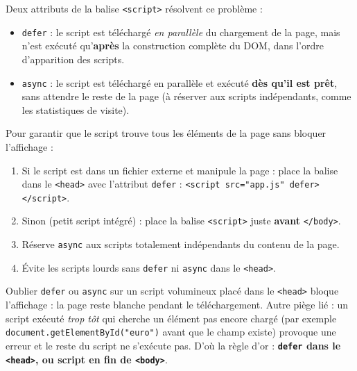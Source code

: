 \documentclass[11pt]{article}
\newcommand{\cle}[1]{{\popxbold\color{popdark}#1}}
\begin{document}
Deux attributs de la balise \texttt{<script>} résolvent ce problème :
\begin{itemize}
    \item \texttt{\cle{defer}} : le script est téléchargé \emph{en parallèle} du chargement de la page, mais n'est exécuté qu'\textbf{après} la construction complète du DOM, dans l'ordre d'apparition des scripts.
    \item \texttt{\cle{async}} : le script est téléchargé en parallèle et exécuté \textbf{dès qu'il est prêt}, sans attendre le reste de la page (à réserver aux scripts indépendants, comme les statistiques de visite).
\end{itemize}

\begin{methode}
Pour garantir que le script trouve tous les éléments de la page sans bloquer l'affichage :
\begin{enumerate}
    \item Si le script est dans un fichier externe et manipule la page : place la balise dans le \texttt{<head>} avec l'attribut \texttt{defer} : \texttt{<script src="app.js" defer></script>}.
    \item Sinon (petit script intégré) : place la balise \texttt{<script>} juste \textbf{avant} \texttt{</body>}.
    \item Réserve \texttt{async} aux scripts totalement indépendants du contenu de la page.
    \item Évite les scripts lourds sans \texttt{defer} ni \texttt{async} dans le \texttt{<head>}.
\end{enumerate}
\end{methode}

\begin{attention}
Oublier \texttt{defer} ou \texttt{async} sur un script volumineux placé dans le \texttt{<head>} bloque l'affichage : la page reste blanche pendant le téléchargement. Autre piège lié : un script exécuté \emph{trop tôt} qui cherche un élément pas encore chargé (par exemple \texttt{document.getElementById("euro")} avant que le champ existe) provoque une erreur et le reste du script ne s'exécute pas. D'où la règle d'or : \textbf{\texttt{defer} dans le \texttt{<head>}, ou script en fin de \texttt{<body>}}.
\end{attention}
\end{document}
